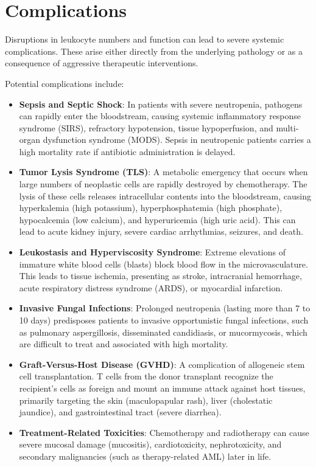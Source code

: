 \section*{Complications}
Disruptions in leukocyte numbers and function can lead to severe systemic complications. These arise either directly from the underlying pathology or as a consequence of aggressive therapeutic interventions.

Potential complications include:
\begin{itemize}
  \item \textbf{Sepsis and Septic Shock}: In patients with severe neutropenia, pathogens can rapidly enter the bloodstream, causing systemic inflammatory response syndrome (SIRS), refractory hypotension, tissue hypoperfusion, and multi-organ dysfunction syndrome (MODS). Sepsis in neutropenic patients carries a high mortality rate if antibiotic administration is delayed.
  \item \textbf{Tumor Lysis Syndrome (TLS)}: A metabolic emergency that occurs when large numbers of neoplastic cells are rapidly destroyed by chemotherapy. The lysis of these cells releases intracellular contents into the bloodstream, causing hyperkalemia (high potassium), hyperphosphatemia (high phosphate), hypocalcemia (low calcium), and hyperuricemia (high uric acid). This can lead to acute kidney injury, severe cardiac arrhythmias, seizures, and death.
  \item \textbf{Leukostasis and Hyperviscosity Syndrome}: Extreme elevations of immature white blood cells (blasts) block blood flow in the microvasculature. This leads to tissue ischemia, presenting as stroke, intracranial hemorrhage, acute respiratory distress syndrome (ARDS), or myocardial infarction.
  \item \textbf{Invasive Fungal Infections}: Prolonged neutropenia (lasting more than 7 to 10 days) predisposes patients to invasive opportunistic fungal infections, such as pulmonary aspergillosis, disseminated candidiasis, or mucormycosis, which are difficult to treat and associated with high mortality.
  \item \textbf{Graft-Versus-Host Disease (GVHD)}: A complication of allogeneic stem cell transplantation. T cells from the donor transplant recognize the recipient's cells as foreign and mount an immune attack against host tissues, primarily targeting the skin (maculopapular rash), liver (cholestatic jaundice), and gastrointestinal tract (severe diarrhea).
  \item \textbf{Treatment-Related Toxicities}: Chemotherapy and radiotherapy can cause severe mucosal damage (mucositis), cardiotoxicity, nephrotoxicity, and secondary malignancies (such as therapy-related AML) later in life.
\end{itemize}

